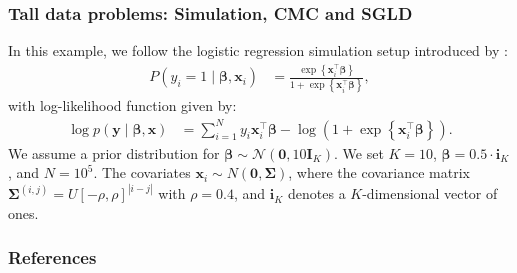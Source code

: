 \documentclass[12pt, compress]{beamer}
\begin{document}
\begin{frame}
	\frametitle{Tall data problems: Simulation, CMC and SGLD}
In this example, we follow the logistic regression simulation setup introduced by \cite{nemeth2021stochastic}:
\begin{align*}
	P(y_i = 1 \mid \boldsymbol{\beta}, \mathbf{x}_i) &= \frac{\exp\left\{\mathbf{x}_i^{\top} \boldsymbol{\beta}\right\}}{1 + \exp\left\{\mathbf{x}_i^{\top} \boldsymbol{\beta}\right\}},
\end{align*}
with log-likelihood function given by:
\begin{align*}
	\log p(\mathbf{y} \mid \boldsymbol{\beta}, \mathbf{x}) 
	&= \sum_{i=1}^N y_i \mathbf{x}_i^{\top} \boldsymbol{\beta} - \log \left(1 + \exp\left\{\mathbf{x}_i^{\top} \boldsymbol{\beta}\right\} \right).
\end{align*}
We assume a prior distribution for \( \boldsymbol{\beta} \sim \mathcal{N}(\mathbf{0}, 10 \mathbf{I}_K) \).
We set \( K = 10 \), \( \boldsymbol{\beta} = 0.5 \cdot \mathbf{i}_K \), and \( N = 10^5 \). The covariates \( \mathbf{x}_i \sim {N}(\mathbf{0}, \boldsymbol{\Sigma}) \), where the covariance matrix \( \boldsymbol{\Sigma}^{(i,j)} = U[-\rho, \rho]^{|i-j|} \) with \( \rho = 0.4 \), and \( \mathbf{i}_K \) denotes a \( K \)-dimensional vector of ones.
\end{frame}

\begin{frame}[allowframebreaks]
	\frametitle{References}
		{\footnotesize
		
		}
\end{frame}
\end{document}
